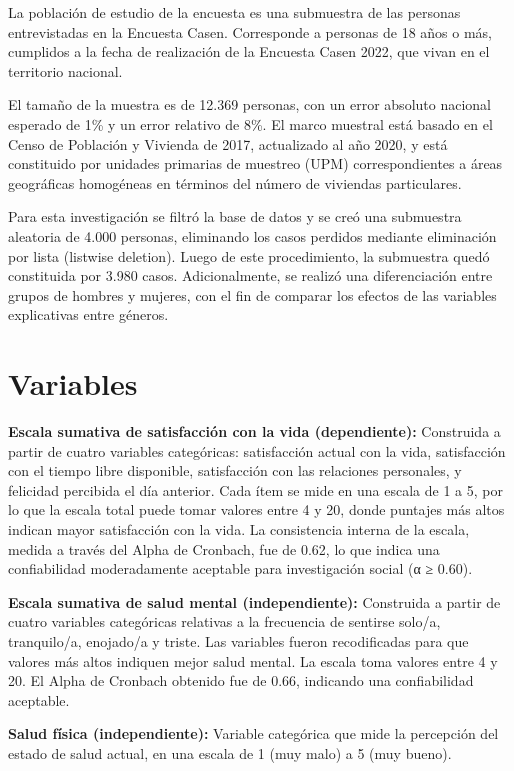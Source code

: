\documentclass[
  spanish,
  a4paper,
  oneside]{scrbook}
\begin{document}
La población de estudio de la encuesta es una submuestra de las personas
entrevistadas en la Encuesta Casen. Corresponde a personas de 18 años o
más, cumplidos a la fecha de realización de la Encuesta Casen 2022, que
vivan en el territorio nacional.

El tamaño de la muestra es de 12.369 personas, con un error absoluto
nacional esperado de 1\% y un error relativo de 8\%. El marco muestral
está basado en el Censo de Población y Vivienda de 2017, actualizado al
año 2020, y está constituido por unidades primarias de muestreo (UPM)
correspondientes a áreas geográficas homogéneas en términos del número
de viviendas particulares.

Para esta investigación se filtró la base de datos y se creó una
submuestra aleatoria de 4.000 personas, eliminando los casos perdidos
mediante eliminación por lista (listwise deletion). Luego de este
procedimiento, la submuestra quedó constituida por 3.980 casos.
Adicionalmente, se realizó una diferenciación entre grupos de hombres y
mujeres, con el fin de comparar los efectos de las variables
explicativas entre géneros.

\section{Variables}\label{variables}

\textbf{Escala sumativa de satisfacción con la vida (dependiente):}
Construida a partir de cuatro variables categóricas: satisfacción actual
con la vida, satisfacción con el tiempo libre disponible, satisfacción
con las relaciones personales, y felicidad percibida el día anterior.
Cada ítem se mide en una escala de 1 a 5, por lo que la escala total
puede tomar valores entre 4 y 20, donde puntajes más altos indican mayor
satisfacción con la vida. La consistencia interna de la escala, medida a
través del Alpha de Cronbach, fue de 0.62, lo que indica una
confiabilidad moderadamente aceptable para investigación social (α ≥
0.60).

\textbf{Escala sumativa de salud mental (independiente):} Construida a
partir de cuatro variables categóricas relativas a la frecuencia de
sentirse solo/a, tranquilo/a, enojado/a y triste. Las variables fueron
recodificadas para que valores más altos indiquen mejor salud mental. La
escala toma valores entre 4 y 20. El Alpha de Cronbach obtenido fue de
0.66, indicando una confiabilidad aceptable.

\textbf{Salud física (independiente):} Variable categórica que mide la
percepción del estado de salud actual, en una escala de 1 (muy malo) a 5
(muy bueno).
\end{document}
